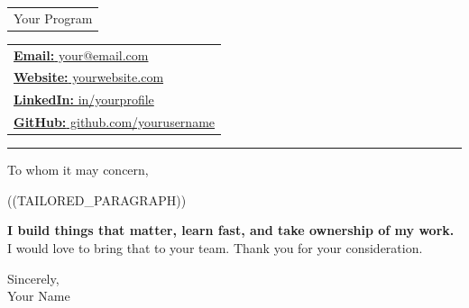 \documentclass[11pt,a4paper]{article}
\begin{document}
\noindent
\begin{minipage}[t]{0.5\textwidth}
\vspace{0pt}
\begin{tabular}[t]{@{}c@{}}
{\scriptsize\color{gray} Your Program}
\end{tabular}
\end{minipage}%
\begin{minipage}[t]{0.5\textwidth}
\vspace{0pt}
\raggedleft
\begin{tabular}[t]{@{}l@{}}
{\small \href{mailto:your@email.com}{\textbf{Email:} your@email.com}}\\
{\small \href{https://yourwebsite.com}{\textbf{Website:} yourwebsite.com}}\\
{\small \href{https://linkedin.com/in/yourprofile}{\textbf{LinkedIn:} in/yourprofile}}\\
{\small \href{https://github.com/yourusername}{\textbf{GitHub:} github.com/yourusername}}
\end{tabular}
\end{minipage}

\vspace{2pt}
{\color{textgray}\noindent\rule{\textwidth}{0.4pt}}
\vspace{0pt}

To whom it may concern,

\vspace{8pt}


\vspace{6pt}

((TAILORED_PARAGRAPH))

\vspace{6pt}

\textbf{I build things that matter, learn fast, and take ownership of my work.}
\\I would love to bring that to your team. Thank you for your consideration.

\vspace{15pt}

Sincerely,\\
Your Name
\end{document}
